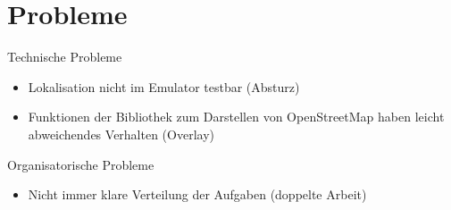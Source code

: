 \documentclass[hyperref]{beamer}
\begin{document}
\section{Probleme}

\begin{frame}{Technische Probleme}
\begin{itemize}
\item Lokalisation nicht im Emulator testbar (Absturz)
\item Funktionen der Bibliothek zum Darstellen von OpenStreetMap haben leicht abweichendes Verhalten (Overlay)
\end{itemize}
\end{frame}

\begin{frame}{Organisatorische Probleme}
\begin{itemize}
\item Nicht immer klare Verteilung der Aufgaben (doppelte Arbeit)
\end{itemize}
\end{frame}
\end{document}
